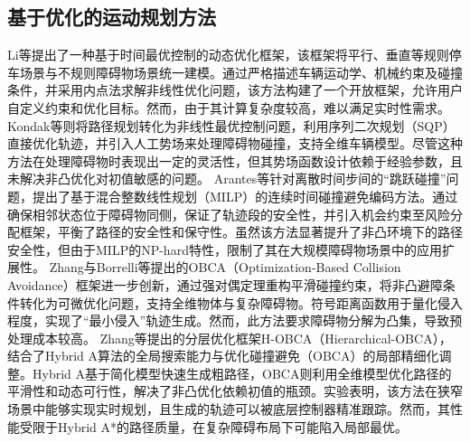 \documentclass[master,academic]{ysuthesis} %
\begin{document}
		\subsection{基于优化的运动规划方法}
		Li等\cite{li2015unified}提出了一种基于时间最优控制的动态优化框架，该框架将平行、垂直等规则停车场景与不规则障碍物场景统一建模。通过严格描述车辆运动学、机械约束及碰撞条件，并采用内点法求解非线性优化问题，该方法构建了一个开放框架，允许用户自定义约束和优化目标。然而，由于其计算复杂度较高，难以满足实时性需求。
		Kondak等\cite{933030}则将路径规划转化为非线性最优控制问题，利用序列二次规划（SQP）直接优化轨迹，并引入人工势场来处理障碍物碰撞，支持全维车辆模型。尽管这种方法在处理障碍物时表现出一定的灵活性，但其势场函数设计依赖于经验参数，且未解决非凸优化对初值敏感的问题。
		Arantes等\cite{8613017}针对离散时间步间的“跳跃碰撞”问题，提出了基于混合整数线性规划（MILP）的连续时间碰撞避免编码方法。通过确保相邻状态位于障碍物同侧，保证了轨迹段的安全性，并引入机会约束至风险分配框架，平衡了路径的安全性和保守性。虽然该方法显著提升了非凸环境下的路径安全性，但由于MILP的NP-hard特性，限制了其在大规模障碍物场景中的应用扩展性。
		Zhang与Borrelli等\cite{9062306}提出的OBCA（Optimization-Based Collision Avoidance）框架进一步创新，通过强对偶定理重构平滑碰撞约束，将非凸避障条件转化为可微优化问题，支持全维物体与复杂障碍物。符号距离函数用于量化侵入程度，实现了“最小侵入”轨迹生成。然而，此方法要求障碍物分解为凸集，导致预处理成本较高。
		Zhang等\cite{8619433}提出的分层优化框架H-OBCA（Hierarchical-OBCA），结合了Hybrid A算法\cite{chang2024hybrid}的全局搜索能力与优化碰撞避免（OBCA）的局部精细化调整。Hybrid A基于简化模型快速生成粗路径，OBCA则利用全维模型优化路径的平滑性和动态可行性，解决了非凸优化依赖初值的瓶颈。实验表明，该方法在狭窄场景中能够实现实时规划，且生成的轨迹可以被底层控制器精准跟踪。然而，其性能受限于Hybrid A*的路径质量，在复杂障碍布局下可能陷入局部最优。
\end{document}
